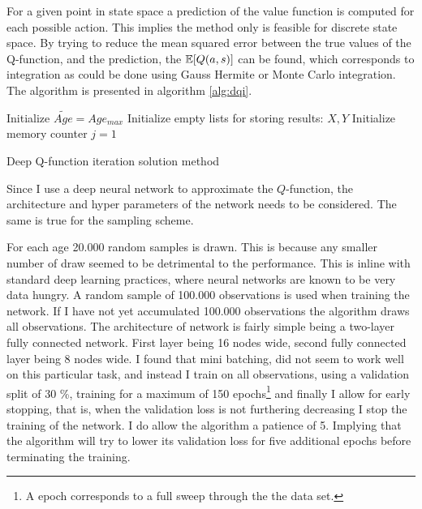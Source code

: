 For a given point in state space a prediction of the value function is computed for each possible action. This implies the method only is feasible for discrete state space. By trying to reduce the mean squared error between the true values of the Q-function, and the prediction, the $\mathbb{E}[Q(a, s)]$ can be found, which corresponds to integration as could be done using Gauss Hermite or Monte Carlo integration. The algorithm is presented in algorithm \ref{alg:dqi}.

\begin{algorithm}[H]
\SetAlgoLined
{}
 Initialize $\tilde{Age} = Age_{max}$\;
 Initialize empty lists for storing results: $X, Y$\;
 Initialize memory counter $j=1$\;
 \caption{Deep Q-function iteration solution method}
 \label{alg:dqi}
 \end{algorithm}

Since I use a deep neural network to approximate the $Q$-function, the architecture and hyper parameters of the network needs to be considered. The same is true for the sampling scheme.

For each age 20.000 random samples is drawn. This is because any smaller number of draw seemed to be detrimental to the performance. This is inline with standard deep learning practices, where neural networks are known to be very data hungry. A random sample of 100.000 observations is used when training the network. If I have not yet accumulated 100.000 observations the algorithm draws all observations. The architecture of network is fairly simple being a two-layer fully connected network. First layer being 16 nodes wide, second fully connected layer being 8 nodes wide. I found that mini batching, did not seem to work well on this particular task, and instead I train on all observations, using a validation split of 30 \%, training for a maximum of 150 epochs\footnote{A epoch corresponds to a full sweep through the the data set.} and finally I allow for early stopping, that is, when the validation loss is not furthering decreasing I stop the training of the network. I do allow the algorithm a patience of 5. Implying that the algorithm will try to lower its validation loss for five additional epochs before terminating the training.



